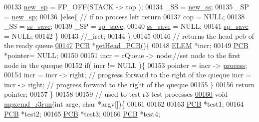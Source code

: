 \begin{DoxyCode}
00133                         \hyperlink{mpx__r3_8c_a1838f728cba427f51c6c45aa89cec007}{new_sp} = FP\_OFF(STACK -> top );
00134                         \_SS = \hyperlink{mpx__r3_8c_a15a3c2a819d08f7ea4c3f453ca0f7f9c}{new_ss};
00135                         \_SP = \hyperlink{mpx__r3_8c_a1838f728cba427f51c6c45aa89cec007}{new_sp};
00136                 \}\textcolor{keywordflow}{else}\{ \textcolor{comment}{// if no process left return}
00137                         cop = NULL;
00138                         \_SS = \hyperlink{mpx__r3_8c_aab74ba3fd0cd88eb3e908a0916cf39ca}{ss_save};
00139                         \_SP = \hyperlink{mpx__r3_8c_a8687fceb4a02634b3967391b0b584c4c}{sp_save};
00140                         \hyperlink{mpx__r3_8c_aab74ba3fd0cd88eb3e908a0916cf39ca}{ss_save} = NULL;
00141                         \hyperlink{mpx__r3_8c_a8687fceb4a02634b3967391b0b584c4c}{sp_save} = NULL;
00142                 \}
00143                 \textcolor{comment}{//\_iret;        }
00144 \}
00145 
00146         \textcolor{comment}{// returns the head pcb of the ready queue}
\hypertarget{mpx__r3_8c_source_l00147}{}\hyperlink{mpx__r3_8c_aa7b04f866ead346c0357975285de0c38}{00147} \hyperlink{structprocess}{PCB} *\hyperlink{mpx__r3_8c_aa7b04f866ead346c0357975285de0c38}{getHead_PCB}()\{
00148                 \hyperlink{structpage}{ELEM} *incr;
00149                 \hyperlink{structprocess}{PCB}  *pointer= NULL;
00150                 
00151                 incr = rQueue -> node;\textcolor{comment}{//set node to the first node in the queque}
00152                 \textcolor{keywordflow}{if}( incr  != NULL )\{
00153                         pointer = incr -> \hyperlink{structprocess}{process};
00154                         incr = incr -> right; \textcolor{comment}{// progress forward to the right of
       the queque                     incr = incr -> right; // progress forward to the 
      right of the queque}
00155                 \}
00156                 \textcolor{keywordflow}{return} pointer;
00157 \}
00158 
00159 \textcolor{comment}{// used to test r3 test processes}
\hypertarget{mpx__r3_8c_source_l00160}{}\hyperlink{_m_p_x___r3_8_h_a204c76cc251c17612164688f0b1272ad}{00160} \textcolor{keywordtype}{void} \hyperlink{mpx__r3_8c_a204c76cc251c17612164688f0b1272ad}{mpxcmd_r3run}(\textcolor{keywordtype}{int} argc, \textcolor{keywordtype}{char} *argv[])\{
00161         
00162         
00163         \hyperlink{structprocess}{PCB} *test1;
00164         \hyperlink{structprocess}{PCB} *test2;
00165         \hyperlink{structprocess}{PCB} *test3;
00166         \hyperlink{structprocess}{PCB} *test4;

\end{DoxyCode}
